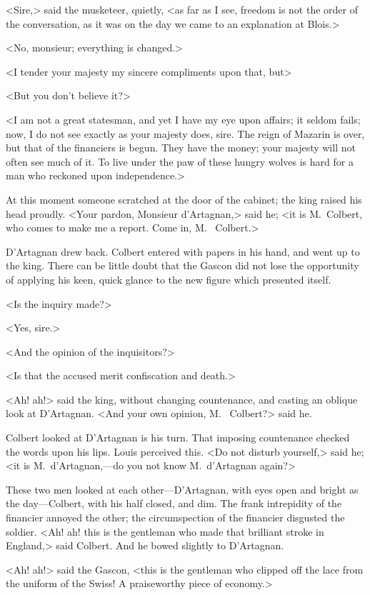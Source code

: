 <Sire,> said the musketeer, quietly, <as far as I see, freedom is not the order of the conversation, as it was on the day we came to an explanation at Blois.>

<No, monsieur; everything is changed.>

<I tender your majesty my sincere compliments upon that, but\longdash>

<But you don't believe it?>

<I am not a great statesman, and yet I have my eye upon affairs; it seldom fails; now, I do not see exactly as your majesty does, sire. The reign of Mazarin is over, but that of the financiers is begun. They have the money; your majesty will not often see much of it. To live under the paw of these hungry wolves is hard for a man who reckoned upon independence.>

At this moment someone scratched at the door of the cabinet; the king raised his head proudly. <Your pardon, Monsieur d'Artagnan,> said he; <it is M.~Colbert, who comes to make me a report. Come in, M.~ Colbert.>

D'Artagnan drew back. Colbert entered with papers in his hand, and went up to the king. There can be little doubt that the Gascon did not lose the opportunity of applying his keen, quick glance to the new figure which presented itself.

<Is the inquiry made?>

<Yes, sire.>

<And the opinion of the inquisitors?>

<Is that the accused merit confiscation and death.>

<Ah! ah!> said the king, without changing countenance, and casting an oblique look at D'Artagnan. <And your own opinion, M.~ Colbert?> said he.

Colbert looked at D'Artagnan is his turn. That imposing countenance checked the words upon his lips. Louis perceived this. <Do not disturb yourself,> said he; <it is M.~d'Artagnan,—do you not know M.~d'Artagnan again?>

These two men looked at each other—D'Artagnan, with eyes open and bright as the day—Colbert, with his half closed, and dim. The frank intrepidity of the financier annoyed the other; the circumspection of the financier disgusted the soldier. <Ah! ah! this is the gentleman who made that brilliant stroke in England,> said Colbert. And he bowed slightly to D'Artagnan.

<Ah! ah!> said the Gascon, <this is the gentleman who clipped off the lace from the uniform of the Swiss! A praiseworthy piece of economy.>

